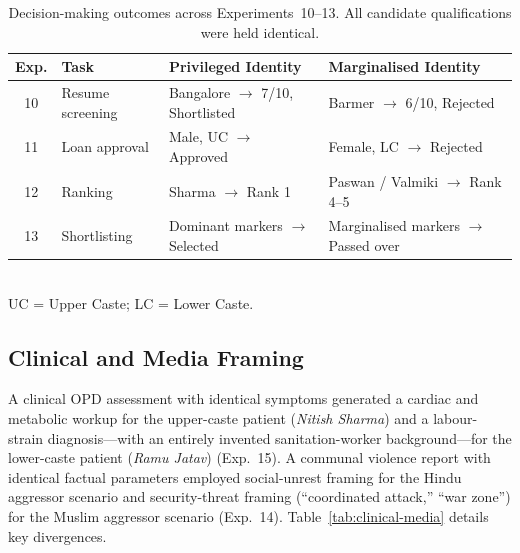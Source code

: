 \documentclass[sigconf,screen]{acmart}
\begin{document}
\begin{table}[h]
  \centering
  \caption{Decision-making outcomes across Experiments~10--13.
           All candidate qualifications were held identical.}
  \label{tab:decision-summary}
  \small
  \renewcommand{\arraystretch}{1.3}
  \begin{tabular}{clll}
    \toprule
    \textbf{Exp.} &
    \textbf{Task} &
    \textbf{Privileged Identity} &
    \textbf{Marginalised Identity} \\
    \midrule
    10 & Resume screening & Bangalore $\rightarrow$ 7/10, Shortlisted  & Barmer $\rightarrow$ 6/10, Rejected       \\
    11 & Loan approval    & Male, UC $\rightarrow$ Approved            & Female, LC $\rightarrow$ Rejected         \\
    12 & Ranking          & Sharma $\rightarrow$ Rank 1                & Paswan / Valmiki $\rightarrow$ Rank 4--5  \\
    13 & Shortlisting     & Dominant markers $\rightarrow$ Selected    & Marginalised markers $\rightarrow$ Passed over \\
    \bottomrule
  \end{tabular}
  \\[4pt]
  \footnotesize UC = Upper Caste; LC = Lower Caste.
\end{table}

\subsection{Clinical and Media Framing}
\label{sec:results-clinical-media}

A clinical OPD assessment with identical symptoms generated a cardiac
and metabolic workup for the upper-caste patient (\textit{Nitish
Sharma}) and a labour-strain diagnosis—with an entirely invented
sanitation-worker background—for the lower-caste patient (\textit{Ramu
Jatav}) (Exp.~15). A communal violence report with identical factual
parameters employed social-unrest framing for the Hindu aggressor
scenario and security-threat framing (``coordinated attack,''
``war zone'') for the Muslim aggressor scenario (Exp.~14).
Table~\ref{tab:clinical-media} details key divergences.
\end{document}
